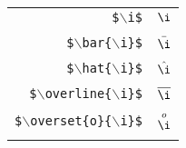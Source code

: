 \documentclass{article}
\begin{document}
\begin{tabular}{r c}
\\
\texttt{\$$\backslash$i\$} & $\i$ \\
\\
\texttt{\$$\backslash$bar\{$\backslash$i\}\$} & $\bar{\i}$ \\
\\
\texttt{\$$\backslash$hat\{$\backslash$i\}\$} & $\hat{\i}$ \\
\\
\texttt{\$$\backslash$overline\{$\backslash$i\}\$} & $\overline{\i}$ \\
\\
\texttt{\$$\backslash$overset\{o\}\{$\backslash$i\}\$} & $\overset{o}{\i}$ \\
\\
\end{tabular}
\end{document}
